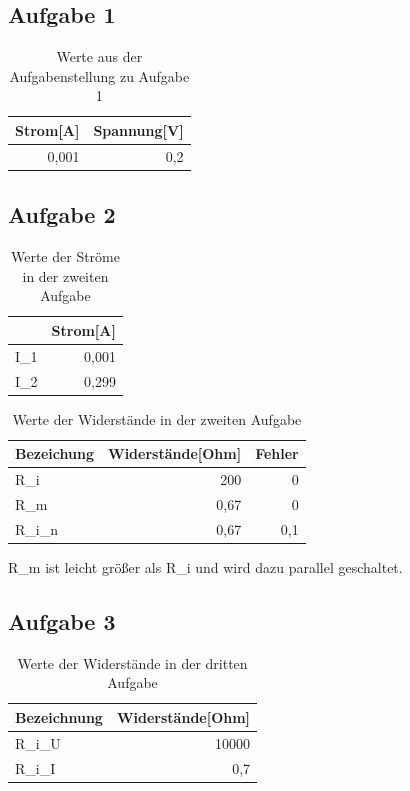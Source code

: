\documentclass[12pt]{scrartcl}
\begin{document}
\newpage

\subsection{Aufgabe 1}
\begin{table}[htbp]
\caption{Werte aus der Aufgabenstellung zu Aufgabe 1}
\centering
\begin{tabular}{|l|l|}
\hline
Strom[A] & Spannung[V] \\ \hline
\multicolumn{1}{|r|}{0,001} & \multicolumn{1}{r|}{0,2} \\ \hline
\end{tabular}
\label{aufgabe_1_grundwerte}
\end{table}


\subsection{Aufgabe 2}
\begin{table}[htbp]
\caption{Werte der Ströme in der zweiten Aufgabe}
\centering
\begin{tabular}{|l|r|}
\hline
 & \multicolumn{1}{l|}{Strom[A]} \\ \hline
I\_1 & 0,001 \\ \hline
I\_2 & 0,299 \\ \hline
\end{tabular}
\label{aufgabe_2_strom}
\end{table}

\begin{table}[htbp]
\caption{Werte der Widerstände in der zweiten Aufgabe}
\centering
\begin{tabular}{|l|r|r|}
\hline
Bezeichung & \multicolumn{1}{l|}{Widerstände[Ohm]} & \multicolumn{1}{l|}{Fehler} \\ \hline
R\_i & 200 & 0 \\ \hline
R\_m & 0,67 & 0 \\ \hline
R\_i\_n & 0,67 & 0,1 \\ \hline
\end{tabular}
\label{aufgabe_2_Widerstände}
\end{table}
R\_m ist leicht größer als R\_i und wird dazu parallel geschaltet.

\newpage

\subsection{Aufgabe 3}

\begin{table}[htbp]
\caption{Werte der Widerstände in der dritten Aufgabe}
\centering
\begin{tabular}{|l|r|}
\hline
Bezeichnung & \multicolumn{1}{l|}{Widerstände[Ohm]} \\ \hline
R\_i\_U & 10000 \\ \hline
R\_i\_I & 0,7 \\ \hline
\end{tabular}
\label{aufgabe_3_Widerstände}
\end{table}
\end{document}
